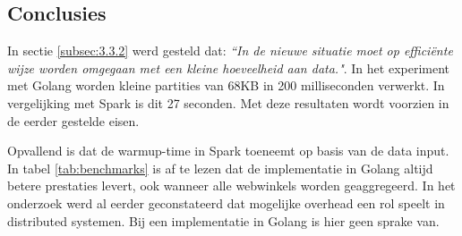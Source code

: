 \subsection{Conclusies}

In sectie \ref{subsec:3.3.2} werd gesteld dat: \textit{``In de nieuwe situatie moet op efficiënte wijze worden omgegaan met een kleine hoeveelheid aan data."}. In het experiment met Golang worden kleine partities van 68KB in 200 milliseconden verwerkt. In vergelijking met Spark is dit 27 seconden. Met deze resultaten wordt voorzien in de eerder gestelde eisen.

Opvallend is dat de warmup-time in Spark toeneemt op basis van de data input. In tabel \ref{tab:benchmarks} is af te lezen dat de implementatie in Golang altijd betere prestaties levert, ook wanneer alle webwinkels worden geaggregeerd. In het onderzoek werd al eerder geconstateerd dat mogelijke overhead een rol speelt in distributed systemen. Bij een implementatie in Golang is hier geen sprake van.


